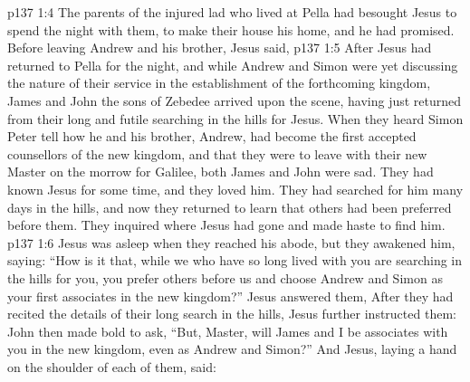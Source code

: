 \vs p137 1:4 \pc The parents of the injured lad who lived at Pella had besought Jesus to spend the night with them, to make their house his home, and he had promised. Before leaving Andrew and his brother, Jesus said, 
\vs p137 1:5 \pc After Jesus had returned to Pella for the night, and while Andrew and Simon were yet discussing the nature of their service in the establishment of the forthcoming kingdom, James and John the sons of Zebedee arrived upon the scene, having just returned from their long and futile searching in the hills for Jesus. When they heard Simon Peter tell how he and his brother, Andrew, had become the first accepted counsellors of the new kingdom, and that they were to leave with their new Master on the morrow for Galilee, both James and John were sad. They had known Jesus for some time, and they loved him. They had searched for him many days in the hills, and now they returned to learn that others had been preferred before them. They inquired where Jesus had gone and made haste to find him.
\vs p137 1:6 Jesus was asleep when they reached his abode, but they awakened him, saying: “How is it that, while we who have so long lived with you are searching in the hills for you, you prefer others before us and choose Andrew and Simon as your first associates in the new kingdom?” Jesus answered them,  After they had recited the details of their long search in the hills, Jesus further instructed them:  John then made bold to ask, “But, Master, will James and I be associates with you in the new kingdom, even as Andrew and Simon?” And Jesus, laying a hand on the shoulder of each of them, said: 
